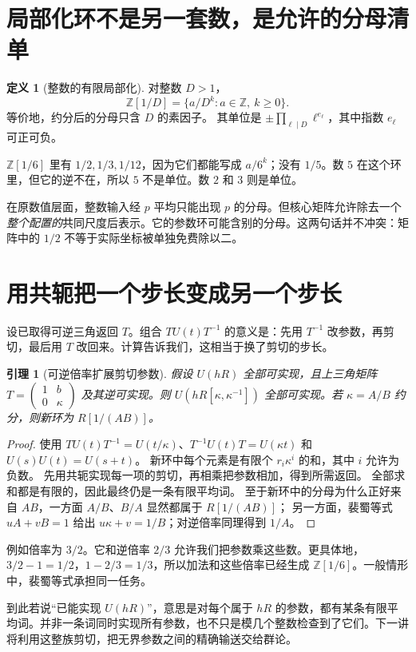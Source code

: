 \documentclass[11pt,a4paper,oneside,openany]{book}
\newcommand{\Z}{\mathbb Z}
\newtheorem{lemma}[theorem]{引理}
\theoremstyle{definition}
\newtheorem{definition}[theorem]{定义}
\numberwithin{equation}{chapter}
\begin{document}
\section{局部化环不是另一套数，是允许的分母清单}
\begin{definition}[整数的有限局部化]
对整数 $D>1$，
\[
\Z[1/D]=\{a/D^k:a\in\Z,\ k\ge0\}.
\]
等价地，约分后的分母只含 $D$ 的素因子。
其单位是 $\pm\prod_{\ell\mid D}\ell^{e_\ell}$，其中指数 $e_\ell$ 可正可负。
\end{definition}
$\Z[1/6]$ 里有 $1/2,1/3,1/12$，因为它们都能写成 $a/6^k$；没有 $1/5$。数 $5$ 在这个环里，但它的逆不在，所以 $5$ 不是单位。数 $2$ 和 $3$ 则是单位。

在原数值层面，整数输入经 $p$ 平均只能出现 $p$ 的分母。但核心矩阵允许除去一个\emph{整个配置的}共同尺度后表示。它的参数环可能含别的分母。这两句话并不冲突：矩阵中的 $1/2$ 不等于实际坐标被单独免费除以二。

\section{用共轭把一个步长变成另一个步长}
设已取得可逆三角返回 $T$。组合 $TU(t)T^{-1}$ 的意义是：先用 $T^{-1}$ 改参数，再剪切，最后用 $T$ 改回来。计算告诉我们，这相当于换了剪切的步长。
\begin{lemma}[可逆倍率扩展剪切参数]\label{lem:localize}
假设 $U(hR)$ 全部可实现，且上三角矩阵 $T=\left(\begin{smallmatrix}1&b\\0&\kappa\end{smallmatrix}\right)$ 及其逆可实现。则 $U(hR[\kappa,\kappa^{-1}])$ 全部可实现。若 $\kappa=A/B$ 约分，则新环为 $R[1/(AB)]$。
\end{lemma}
\begin{proof}
使用 $TU(t)T^{-1}=U(t/\kappa)$、$T^{-1}U(t)T=U(\kappa t)$ 和 $U(s)U(t)=U(s+t)$。
新环中每个元素是有限个 $r_i\kappa^i$ 的和，其中 $i$ 允许为负数。
先用共轭实现每一项的剪切，再相乘把参数相加，得到所需返回。
全部求和都是有限的，因此最终仍是一条有限平均词。
至于新环中的分母为什么正好来自 $AB$，一方面 $A/B$、$B/A$ 显然都属于 $R[1/(AB)]$；
另一方面，裴蜀等式 $uA+vB=1$ 给出 $u\kappa+v=1/B$；对逆倍率同理得到 $1/A$。
\end{proof}
例如倍率为 $3/2$。它和逆倍率 $2/3$ 允许我们把参数乘这些数。更具体地，$3/2-1=1/2$，$1-2/3=1/3$，所以加法和这些倍率已经生成 $\Z[1/6]$。一般情形中，裴蜀等式承担同一任务。

到此若说“已能实现 $U(hR)$”，意思是对每个属于 $hR$ 的参数，都有某条有限平均词。并非一条词同时实现所有参数，也不只是模几个整数检查到了它们。下一讲将利用这整族剪切，把无界参数之间的精确输送交给群论。
\end{document}
